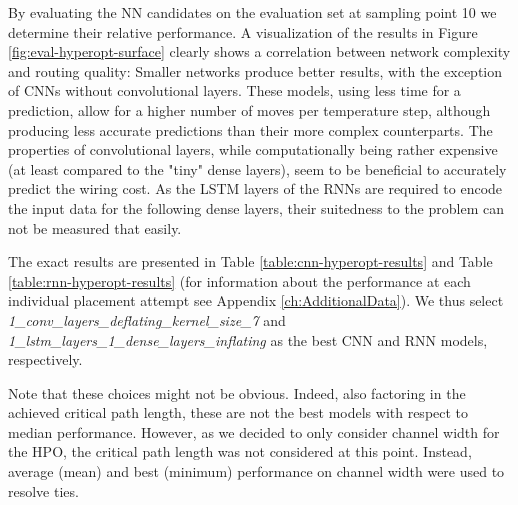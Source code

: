 By evaluating the \gls{NN} candidates on the evaluation set at sampling point 10 we determine their relative performance. A visualization of the results in Figure \ref{fig:eval-hyperopt-surface} clearly shows a correlation between network complexity and routing quality: Smaller networks produce better results, with the exception of \glspl{CNN} without convolutional layers. These models, using less time for a prediction, allow for a higher number of moves per temperature step, although producing less accurate predictions than their more complex counterparts. The properties of convolutional layers, while computationally being rather expensive (at least compared to the "tiny" dense layers), seem to be beneficial to accurately predict the wiring cost. As the \gls{LSTM} layers of the \glspl{RNN} are required to encode the input data for the following dense layers, their suitedness to the problem can not be measured that easily.

The exact results are presented in Table \ref{table:cnn-hyperopt-results} and Table \ref{table:rnn-hyperopt-results} (for information about the performance at each individual placement attempt see Appendix \ref{ch:AdditionalData}). We thus select \textit{1\_conv\_layers\_deflating\_kernel\_size\_7} and \textit{1\_lstm\_layers\_1\_dense\_layers\_inflating} as the best \gls{CNN} and \gls{RNN} models, respectively. 

Note that these choices might not be obvious. Indeed, also factoring in the achieved critical path length, these are not the best models with respect to median performance. However, as we decided to only consider channel width for the \gls{HPO}, the critical path length was not considered at this point. Instead, average (mean) and best (minimum) performance on channel width were used to resolve ties.


